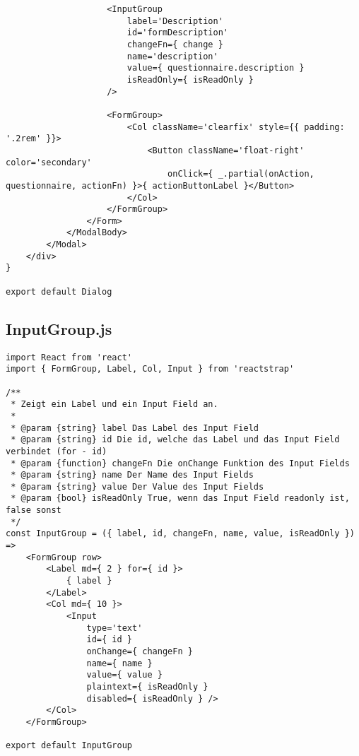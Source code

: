 \begin{verbatim}
                    <InputGroup 
                        label='Description'
                        id='formDescription'
                        changeFn={ change }
                        name='description'
                        value={ questionnaire.description }
                        isReadOnly={ isReadOnly }
                    /> 

                    <FormGroup>
                        <Col className='clearfix' style={{ padding: '.2rem' }}>
                            <Button className='float-right' color='secondary'
                                onClick={ _.partial(onAction, questionnaire, actionFn) }>{ actionButtonLabel }</Button>
                        </Col>
                    </FormGroup>
                </Form>
            </ModalBody>
        </Modal>
    </div>
}

export default Dialog
\end{verbatim}

\subsection{InputGroup.js}

\begin{verbatim}
import React from 'react'
import { FormGroup, Label, Col, Input } from 'reactstrap'

/**
 * Zeigt ein Label und ein Input Field an.
 * 
 * @param {string} label Das Label des Input Field
 * @param {string} id Die id, welche das Label und das Input Field verbindet (for - id)
 * @param {function} changeFn Die onChange Funktion des Input Fields
 * @param {string} name Der Name des Input Fields
 * @param {string} value Der Value des Input Fields
 * @param {bool} isReadOnly True, wenn das Input Field readonly ist, false sonst
 */
const InputGroup = ({ label, id, changeFn, name, value, isReadOnly }) => 
    <FormGroup row>
        <Label md={ 2 } for={ id }>
            { label }
        </Label>
        <Col md={ 10 }>
            <Input 
                type='text' 
                id={ id }
                onChange={ changeFn }
                name={ name }
                value={ value }
                plaintext={ isReadOnly }
                disabled={ isReadOnly } />
        </Col>
    </FormGroup>

export default InputGroup
\end{verbatim}


